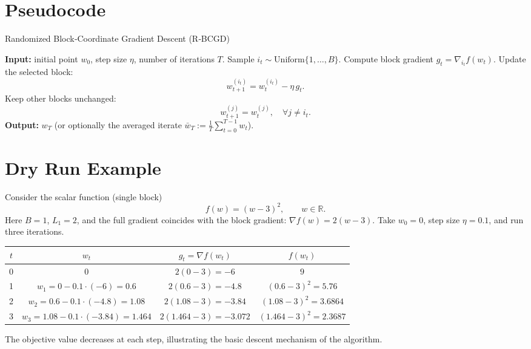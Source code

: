 \documentclass{article}
\begin{document}
\section*{Pseudocode}
\begin{algorithm}[H]
\caption{Randomized Block‑Coordinate Gradient Descent (R‑BCGD)}
\label{alg:rbcgd}
\begin{algorithmic}[1]
\STATE \textbf{Input:} initial point $w_0$, step size $\eta$, number of iterations $T$.
    \STATE Sample $i_t\sim \mathrm{Uniform}\{1,\dots ,B\}$.
    \STATE Compute block gradient $g_t=\nabla_{i_t}f(w_t)$.
    \STATE Update the selected block:
    \[
    w_{t+1}^{(i_t)} = w_t^{(i_t)}-\eta\, g_t .
    \]
    \STATE Keep other blocks unchanged:
    \[
    w_{t+1}^{(j)} = w_t^{(j)},\quad\forall j\neq i_t .
    \]
\ENDFOR
\STATE \textbf{Output:} $w_T$ (or optionally the averaged iterate $\bar w_T:=\frac1T\sum_{t=0}^{T-1}w_t$).
\end{algorithmic}
\end{algorithm}

\section*{Dry Run Example}
Consider the scalar function (single block) 
\[
f(w)=(w-3)^2,\qquad w\in\mathbb{R}.
\]
Here $B=1$, $L_1=2$, and the full gradient coincides with the block gradient:
$\nabla f(w)=2(w-3)$.  
Take $w_0=0$, step size $\eta=0.1$, and run three iterations.

\begin{center}
\begin{tabular}{c|c|c|c}
$t$ & $w_t$ & $g_t=\nabla f(w_t)$ & $f(w_t)$\\ \hline
0 & $0$ & $2(0-3)=-6$ & $9$\\
1 & $w_1=0-0.1\cdot(-6)=0.6$ & $2(0.6-3)=-4.8$ & $(0.6-3)^2=5.76$\\
2 & $w_2=0.6-0.1\cdot(-4.8)=1.08$ & $2(1.08-3)=-3.84$ & $(1.08-3)^2=3.6864$\\
3 & $w_3=1.08-0.1\cdot(-3.84)=1.464$ & $2(1.464-3)=-3.072$ & $(1.464-3)^2=2.3687$\\
\end{tabular}
\end{center}
The objective value decreases at each step, illustrating the basic descent mechanism of the algorithm.
\end{document}
